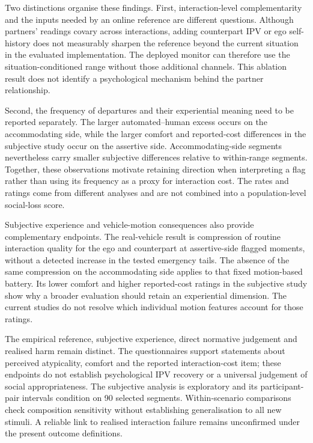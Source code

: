 \documentclass[12pt,a4paper]{article}
\begin{document}
Two distinctions organise these findings. First, interaction-level complementarity and the inputs
needed by an online reference are different questions. Although partners' readings covary across
interactions, adding counterpart IPV or ego self-history does not measurably sharpen the reference
beyond the current situation in the evaluated implementation. The deployed monitor can therefore
use the situation-conditioned range without those additional channels. This ablation result does not
identify a psychological mechanism behind the partner relationship.

Second, the frequency of departures and their experiential meaning need to be reported separately.
The larger automated--human excess occurs on the accommodating side, while the larger comfort and
reported-cost differences in the subjective study occur on the assertive side. Accommodating-side
segments nevertheless carry smaller subjective differences relative to within-range segments.
Together, these observations motivate retaining direction when interpreting a flag rather than
using its frequency as a proxy for interaction cost. The rates and ratings come from different
analyses and are not combined into a population-level social-loss score.

Subjective experience and vehicle-motion consequences also provide complementary endpoints. The
real-vehicle result is compression of routine interaction quality for the ego and counterpart at
assertive-side flagged moments, without a detected increase in the tested emergency tails. The
absence of the same compression on the accommodating side applies to that fixed motion-based
battery. Its lower comfort and higher reported-cost ratings in the subjective study show why a
broader evaluation should retain an experiential dimension. The current studies do not resolve
which individual motion features account for those ratings.

The empirical reference, subjective experience, direct normative judgement and realised harm remain
distinct. The questionnaires support statements about perceived atypicality, comfort and the
reported interaction-cost item; these endpoints do not establish psychological IPV recovery or a
universal judgement of social appropriateness. The subjective analysis is exploratory and its
participant-pair intervals condition on 90 selected segments. Within-scenario comparisons check
composition sensitivity without establishing generalisation to all new stimuli. A reliable link to
realised interaction failure remains unconfirmed under the present outcome definitions.
\end{document}
